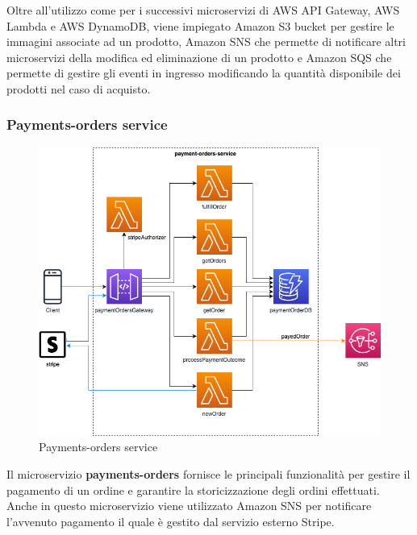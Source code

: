 Oltre all'utilizzo come per i successivi microservizi di AWS API Gateway, AWS Lambda e AWS DynamoDB, viene impiegato Amazon S3 bucket per gestire le immagini associate ad un prodotto,  Amazon SNS che permette di notificare altri microservizi della modifica ed eliminazione di un prodotto e Amazon SQS che permette di gestire gli eventi in ingresso modificando la quantità disponibile dei prodotti nel caso di acquisto.

\subsubsection{Payments-orders service}
\begin{figure}[H]
	\centering
	\includegraphics[scale=0.4]{Immagini/Backend/AWSPaymentOrders.png}
	\caption{Payments-orders service}
	\label{fig:Payment-orders}
\end{figure}
Il microservizio \textbf{payments-orders} fornisce le principali funzionalità per gestire il pagamento di un ordine e garantire la storicizzazione degli ordini effettuati. Anche in questo microservizio viene utilizzato Amazon SNS per notificare l'avvenuto pagamento il quale è gestito dal servizio esterno Stripe.

